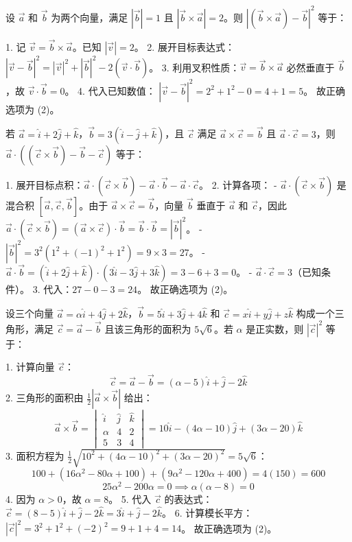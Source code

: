 \begin{questions}
\question
设 $\vec{a}$ 和 $\vec{b}$ 为两个向量，满足 $|\vec{b}| = 1$ 且 $|\vec{b} \times \vec{a}| = 2$。则 $|(\vec{b} \times \vec{a}) - \vec{b}|^2$ 等于：

\begin{solution}
1. 记 $\vec{v} = \vec{b} \times \vec{a}$。已知 $|\vec{v}| = 2$。
2. 展开目标表达式：$| \vec{v} - \vec{b} |^2 = |\vec{v}|^2 + |\vec{b}|^2 - 2(\vec{v} \cdot \vec{b})$。
3. 利用叉积性质：$\vec{v} = \vec{b} \times \vec{a}$ 必然垂直于 $\vec{b}$，故 $\vec{v} \cdot \vec{b} = 0$。
4. 代入已知数值：
   $| \vec{v} - \vec{b} |^2 = 2^2 + 1^2 - 0 = 4 + 1 = 5$。
故正确选项为 (2)。
\end{solution}

\question
若 $\vec{a} = \hat{i} + 2\hat{j} + \hat{k}$，$\vec{b} = 3(\hat{i} - \hat{j} + \hat{k})$，且 $\vec{c}$ 满足 $\vec{a} \times \vec{c} = \vec{b}$ 且 $\vec{a} \cdot \vec{c} = 3$，则 $\vec{a} \cdot ((\vec{c} \times \vec{b}) - \vec{b} - \vec{c})$ 等于：

\begin{solution}
1. 展开目标点积：$\vec{a} \cdot (\vec{c} \times \vec{b}) - \vec{a} \cdot \vec{b} - \vec{a} \cdot \vec{c}$。
2. 计算各项：
   - $\vec{a} \cdot (\vec{c} \times \vec{b})$ 是混合积 $[\vec{a}, \vec{c}, \vec{b}]$。由于 $\vec{a} \times \vec{c} = \vec{b}$，向量 $\vec{b}$ 垂直于 $\vec{a}$ 和 $\vec{c}$，因此 $\vec{a} \cdot (\vec{c} \times \vec{b}) = (\vec{a} \times \vec{c}) \cdot \vec{b} = \vec{b} \cdot \vec{b} = |\vec{b}|^2$。
   - $|\vec{b}|^2 = 3^2 (1^2 + (-1)^2 + 1^2) = 9 \times 3 = 27$。
   - $\vec{a} \cdot \vec{b} = (\hat{i} + 2\hat{j} + \hat{k}) \cdot (3\hat{i} - 3\hat{j} + 3\hat{k}) = 3 - 6 + 3 = 0$。
   - $\vec{a} \cdot \vec{c} = 3$（已知条件）。
3. 代入：$27 - 0 - 3 = 24$。
故正确选项为 (2)。
\end{solution}

\question
设三个向量 $\vec{a} = \alpha\hat{i} + 4\hat{j} + 2\hat{k}$，$\vec{b} = 5\hat{i} + 3\hat{j} + 4\hat{k}$ 和 $\vec{c} = x\hat{i} + y\hat{j} + z\hat{k}$ 构成一个三角形，满足 $\vec{c} = \vec{a} - \vec{b}$ 且该三角形的面积为 $5\sqrt{6}$。若 $\alpha$ 是正实数，则 $|\vec{c}|^2$ 等于：

\begin{solution}
1. 计算向量 $\vec{c}$：
\[ \vec{c} = \vec{a} - \vec{b} = (\alpha-5)\hat{i} + \hat{j} - 2\hat{k} \]
2. 三角形的面积由 $\frac{1}{2}|\vec{a} \times \vec{b}|$ 给出：
\[ \vec{a} \times \vec{b} = \begin{vmatrix} \hat{i} & \hat{j} & \hat{k} \\ \alpha & 4 & 2 \\ 5 & 3 & 4 \end{vmatrix} = 10\hat{i} - (4\alpha-10)\hat{j} + (3\alpha-20)\hat{k} \]
3. 面积方程为 $\frac{1}{2}\sqrt{10^2 + (4\alpha-10)^2 + (3\alpha-20)^2} = 5\sqrt{6}$：
\[ 100 + (16\alpha^2 - 80\alpha + 100) + (9\alpha^2 - 120\alpha + 400) = 4(150) = 600 \]
\[ 25\alpha^2 - 200\alpha = 0 \implies \alpha(\alpha-8) = 0 \]
4. 因为 $\alpha > 0$，故 $\alpha = 8$。
5. 代入 $\vec{c}$ 的表达式：$\vec{c} = (8-5)\hat{i} + \hat{j} - 2\hat{k} = 3\hat{i} + \hat{j} - 2\hat{k}$。
6. 计算模长平方：$|\vec{c}|^2 = 3^2 + 1^2 + (-2)^2 = 9 + 1 + 4 = 14$。
故正确选项为 (2)。
\end{solution}


\end{questions}
